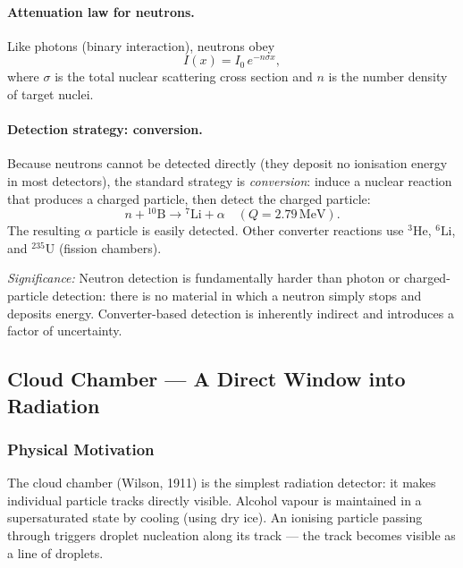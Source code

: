 
\paragraph{Attenuation law for neutrons.}
Like photons (binary interaction), neutrons obey
\begin{equation}
  \label{eq:lec06:neutron_attenuation}
  I(x) = I_0\,e^{-n\sigma x},
\end{equation}
where $\sigma$ is the total nuclear scattering cross section and $n$ is the
number density of target nuclei.

\paragraph{Detection strategy: conversion.}
Because neutrons cannot be detected directly (they deposit no ionisation energy
in most detectors), the standard strategy is \emph{conversion}: induce a nuclear
reaction that produces a charged particle, then detect the charged particle:
\begin{equation}
  \label{eq:lec06:neutron_convert}
  n + {}^{10}\!\text{B} \to {}^7\!\text{Li} + \alpha\quad(Q=2.79\,\text{MeV}).
\end{equation}
The resulting $\alpha$ particle is easily detected.  Other converter reactions
use ${}^{3}\text{He}$, ${}^{6}\text{Li}$, and ${}^{235}\text{U}$ (fission chambers).

\textit{Significance:} Neutron detection is fundamentally harder than photon or
charged-particle detection: there is no material in which a neutron simply stops
and deposits energy.  Converter-based detection is inherently indirect and
introduces a factor of uncertainty.

\subsection{Cloud Chamber — A Direct Window into Radiation}
\label{subsec:lec06:cloud}

\subsubsection*{Physical Motivation}
The cloud chamber (Wilson, 1911) is the simplest radiation detector: it makes
individual particle tracks directly visible.  Alcohol vapour is maintained in a
supersaturated state by cooling (using dry ice).  An ionising particle passing
through triggers droplet nucleation along its track — the track becomes visible
as a line of droplets.

